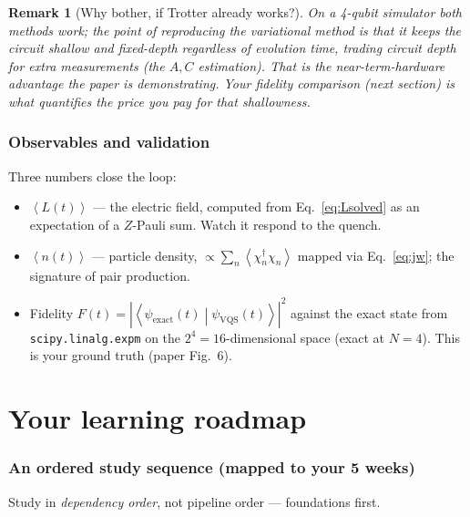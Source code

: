 \documentclass[11pt,a4paper]{article}
\newcommand{\braket}[2]{\left\langle#1\middle|#2\right\rangle}
\newcommand{\ev}[1]{\left\langle#1\right\rangle}
\newtheorem{remark}{Remark}[section]
\begin{document}
\begin{remark}[Why bother, if Trotter already works?]
On a 4-qubit simulator both methods work; the \emph{point} of reproducing the variational method is
that it keeps the circuit \emph{shallow and fixed-depth} regardless of evolution time, trading circuit
depth for extra measurements (the $A,C$ estimation). That is the near-term-hardware advantage the
paper is demonstrating. Your fidelity comparison (next section) is what quantifies the price you pay
for that shallowness.
\end{remark}

\section{Observables and validation}\label{sec:obs}
Three numbers close the loop:
\begin{itemize}[leftmargin=1.5em]
\item $\ev{L(t)}$ --- the electric field, computed from Eq.~\eqref{eq:Lsolved} as an expectation of a
$Z$-Pauli sum. Watch it respond to the quench.
\item $\ev{n(t)}$ --- particle density, $\propto\sum_n\ev{\chi^\dagger_n\chi_n}$ mapped via
Eq.~\eqref{eq:jw}; the signature of pair production.
\item Fidelity $F(t)=|\braket{\psi_{\text{exact}}(t)}{\psi_{\text{VQS}}(t)}|^2$ against the exact
state from \texttt{scipy.linalg.expm} on the $2^4=16$-dimensional space (exact at $N=4$). This is your
ground truth (paper Fig.~6).
\end{itemize}

\part{Your learning roadmap}

\section{An ordered study sequence (mapped to your 5 weeks)}
Study in \emph{dependency order}, not pipeline order --- foundations first.
\end{document}
